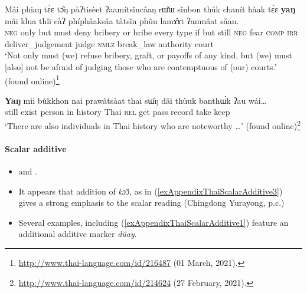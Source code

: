 \begin{exe}
	\ex \gll Mâi	phiaŋ		tɛ̀ɛ	tɔ̂ŋ	pàʔtisèet	ʔaamítsǐncâaŋ	rɯ̌ɯ	sǐnbon thúk		chanít	hàak	tɛ̀ɛ	\textbf{yaŋ}	mâi	klua	thîi		càʔ phíphâaksǎa		tàtsǐn		phûu		lamɤ̂ɤt	ʔamnâat	sǎan.\\
			\textsc{neg} only but must deny bribery or bribe every type if but still \textsc{neg} fear \textsc{comp} \textsc{irr} deliver\_judgement judge \textsc{nmlz} break\_law authority court\\
	\glt \lq Not only must (we) refuse bribery, graft, or payoffs of any kind, but (we) must [also] not be afraid of judging those who are contemptuous of (our) courts.' (found online)\footnote{\url{http://www.thai-language.com/id/216487} (01 March, 2021).}
			
	\ex
	\gll \textbf{Yaŋ}	mii	bùkkhon	nai	prawàtsàat	thai	sɯ̂ŋ	dâi	thùuk	banthɯ́k	ʔau	wái…\\
		still exist person in history	Thai \textsc{rel}	 get pass record take keep\\
	\glt \lq There are also individuals in Thai history who are noteworthy …' (found online)\footnote{\url{http://www.thai-language.com/id/214624} (27 February, 2021).}
\end{exe}


\paragraph{Scalar additive}\label{appendixThaiScalarAdditive}
\begin{itemize}
	\item \textcite[240]{HigbieThinsan2002} and \textcite[182]{Noss1964}.
	\item It appears that addition of \textit{kɔ̂ɔ}, as in (\ref{exAppendixThaiScalarAdditive3}) gives a strong emphasis to the scalar reading (Chingdong Yurayong, p.c.)
	\item Several examples, including (\ref{exAppendixThaiScalarAdditive1}) feature an additional additive marker \textit{dûay}.
\end{itemize}

